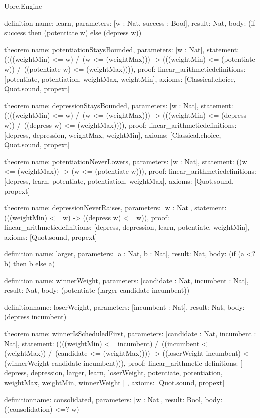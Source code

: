 \begin{lexlean}{Uorc.Engine}
\begin{semanticmodule}
definition{
  name: learn,
  parameters: [w : Nat, success : Bool],
  result: Nat,
  body: (if success then (potentiate w) else (depress w))
}

theorem{
  name: potentiationStaysBounded,
  parameters: [w : Nat],
  statement: ((((weightMin) <= w) /\ (w <= (weightMax))) -> (((weightMin) <= (potentiate w)) /\ ((potentiate w) <= (weightMax)))),
  proof: linear_arithmetic{definitions: [potentiate, potentiation, weightMax, weightMin]},
  axioms: [Classical.choice, Quot.sound, propext]
}

theorem{
  name: depressionStaysBounded,
  parameters: [w : Nat],
  statement: ((((weightMin) <= w) /\ (w <= (weightMax))) -> (((weightMin) <= (depress w)) /\ ((depress w) <= (weightMax)))),
  proof: linear_arithmetic{definitions: [depress, depression, weightMax, weightMin]},
  axioms: [Classical.choice, Quot.sound, propext]
}

theorem{
  name: potentiationNeverLowers,
  parameters: [w : Nat],
  statement: ((w <= (weightMax)) -> (w <= (potentiate w))),
  proof: linear_arithmetic{definitions: [depress, learn, potentiate, potentiation, weightMax]},
  axioms: [Quot.sound, propext]
}

theorem{
  name: depressionNeverRaises,
  parameters: [w : Nat],
  statement: (((weightMin) <= w) -> ((depress w) <= w)),
  proof: linear_arithmetic{definitions: [depress, depression, learn, potentiate, weightMin]},
  axioms: [Quot.sound, propext]
}

definition{
  name: larger,
  parameters: [a : Nat, b : Nat],
  result: Nat,
  body: (if (a <? b) then b else a)
}

definition{
  name: winnerWeight,
  parameters: [candidate : Nat, incumbent : Nat],
  result: Nat,
  body: (potentiate (larger candidate incumbent))
}

definition{name: loserWeight, parameters: [incumbent : Nat], result: Nat, body: (depress incumbent)}

theorem{
  name: winnerIsScheduledFirst,
  parameters: [candidate : Nat, incumbent : Nat],
  statement: ((((weightMin) <= incumbent) /\ ((incumbent <= (weightMax)) /\ (candidate <= (weightMax)))) -> ((loserWeight incumbent) < (winnerWeight candidate incumbent))),
  proof: linear_arithmetic{
    definitions: [
      depress,
      depression,
      larger,
      learn,
      loserWeight,
      potentiate,
      potentiation,
      weightMax,
      weightMin,
      winnerWeight
    ]
  },
  axioms: [Quot.sound, propext]
}

definition{name: consolidated, parameters: [w : Nat], result: Bool, body: ((consolidation) <=? w)}


\end{semanticmodule}
\end{lexlean}
